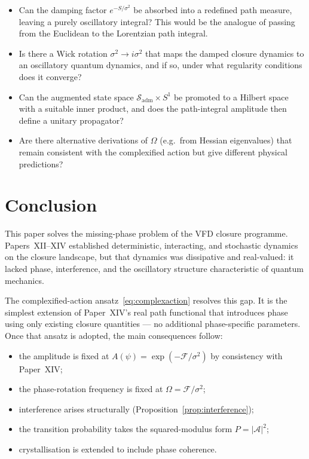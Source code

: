 \documentclass[12pt]{article}
\newcommand{\Fcal}{\mathcal{F}}
\newcommand{\Sadm}{\mathcal{S}_{\mathrm{adm}}}
\begin{document}
\begin{itemize}
    \item Can the damping factor $e^{-S/\sigma^2}$ be absorbed into a redefined path measure, leaving a purely oscillatory integral? This would be the analogue of passing from the Euclidean to the Lorentzian path integral.
    \item Is there a Wick rotation $\sigma^2 \to i\sigma^2$ that maps the damped closure dynamics to an oscillatory quantum dynamics, and if so, under what regularity conditions does it converge?
    \item Can the augmented state space $\Sadm \times S^1$ be promoted to a Hilbert space with a suitable inner product, and does the path-integral amplitude then define a unitary propagator?
    \item Are there alternative derivations of $\Omega$ (e.g.\ from Hessian eigenvalues) that remain consistent with the complexified action but give different physical predictions?
\end{itemize}

\section{Conclusion}\label{sec:conclusion}

This paper solves the missing-phase problem of the VFD closure programme. Papers~XII--XIV established deterministic, interacting, and stochastic dynamics on the closure landscape, but that dynamics was dissipative and real-valued: it lacked phase, interference, and the oscillatory structure characteristic of quantum mechanics.

The complexified-action ansatz~\eqref{eq:complexaction} resolves this gap. It is the simplest extension of Paper~XIV's real path functional that introduces phase using only existing closure quantities --- no additional phase-specific parameters. Once that ansatz is adopted, the main consequences follow:
\begin{itemize}
    \item the amplitude is fixed at $A(\psi) = \exp(-\Fcal/\sigma^2)$ by consistency with Paper~XIV;
    \item the phase-rotation frequency is fixed at $\Omega = \Fcal/\sigma^2$;
    \item interference arises structurally (Proposition~\ref{prop:interference});
    \item the transition probability takes the squared-modulus form $P = |\mathcal{A}|^2$;
    \item crystallisation is extended to include phase coherence.
\end{itemize}
\end{document}
